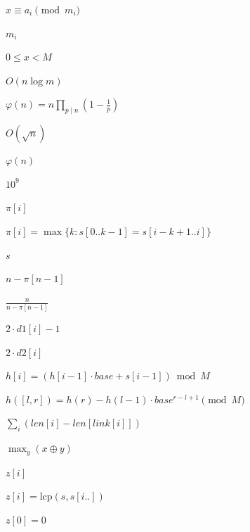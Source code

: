 \documentclass{article}
\begin{document}
$x \equiv a_i \pmod{m_i}$
\pagebreak

$m_i$
\pagebreak

$0 \le x < M$
\pagebreak

$O(n \log m)$
\pagebreak

$\varphi(n) = n \prod_{p \mid n} (1 - \frac{1}{p})$
\pagebreak

$O(\sqrt n)$
\pagebreak

$\varphi(n)$
\pagebreak

$10^9$
\pagebreak

$\pi[i]$
\pagebreak

$\pi[i] = \max\{k : s[0..k-1] = s[i-k+1..i]\}$
\pagebreak

$s$
\pagebreak

$n - \pi[n-1]$
\pagebreak

$\frac{n}{n-\pi[n-1]}$
\pagebreak

$2\cdot d1[i]-1$
\pagebreak

$2\cdot d2[i]$
\pagebreak

$h[i] = (h[i-1]\cdot base + s[i-1]) \bmod M$
\pagebreak

$h([l,r]) = h(r) - h(l-1) \cdot base^{r-l+1} \pmod{M}$
\pagebreak

$\sum_i (len[i] - len[link[i]])$
\pagebreak

$\max_y (x \oplus y)$
\pagebreak

$z[i]$
\pagebreak

$z[i] = \mathrm{lcp}(s, s[i..])$
\pagebreak

$z[0] = 0$
\pagebreak
\end{document}
